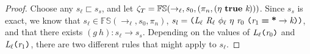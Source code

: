 \begin{proof}
Choose any $s_\ell \sqsubset s_s$, and let $\zeta_T = \mathbb{FS}(\rightarrow_{\ell},s_0,(\pi_n,(\eta\ \cfgt{true}\ \cfgnt{k})))$. Since $s_s$ is exact, we know that $s_\ell \in \mathbb{FS}(\rightarrow_{\ell},s_0,\pi_n)$, $s_l = \lp \cfgnt{L}_\ell\ \cfgnt{R}_\ell\ \phi_\ell\ \eta\ \cfgnt{r}_0\ \lp \cfgnt{r}_1\; \cfgt{=}\; \cfgt{*} \rightarrow \cfgnt{k}\rp \rp$, and that there exists $(g\ h) : s_\ell \rightarrow s_s$. 
Depending on the values of $\emph{L}_\ell \texttt{(} \emph{r}_0\texttt{)}$ and $\emph{L}_\ell \texttt{(} \emph{r}_1 \texttt{)}$, there are two different rules that might apply to $s_\ell$.


\end{proof}
